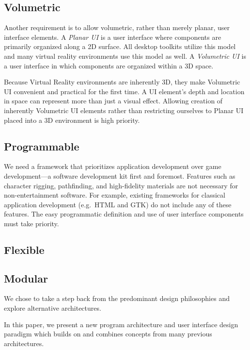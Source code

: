 \documentclass[conference,12pt]{IEEEtran}
\begin{document}
\subsection{Volumetric}
Another requirement is to allow volumetric, rather than merely planar, user
interface elements. A \textit{Planar UI} is a user interface where components
are primarily organized along a 2D surface. All desktop toolkits utilize this
model and many virtual reality environments use this model as well. A
\textit{Volumetric UI} is a user interface in which components are organized
within a 3D space.

Because Virtual Reality environments are inherently 3D, they make Volumetric UI
convenient and practical for the first time. A UI element's depth and location
in space can represent more than just a visual effect. Allowing creation of
inherently Volumetric UI elements rather than restricting ourselves to Planar UI
placed into a 3D environment is high priority.

\subsection{Programmable}

We need a framework that prioritizes application development over game
development---a software development kit first and foremost. Features such as
character rigging, pathfinding, and high-fidelity materials are not necessary
for non-entertainment software. For example, existing frameworks for classical
application development (e.g.\ HTML and GTK) do not include any of these
features. The easy programmatic definition and use of user interface components
must take priority.

\subsection{Flexible}

\subsection{Modular}

We chose to take a step back from the predominant design philosophies and
explore alternative architectures.


In this paper, we present a new program architecture and user interface design
paradigm which builds on and combines concepts from many previous architectures.
\end{document}
